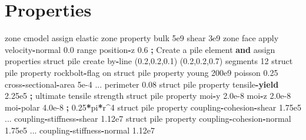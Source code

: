 \documentclass[a4paper, nobind]{templates/ociamthesis}
\newenvironment{Shaded}{\begin{snugshade}}{\end{snugshade}}
\newcommand{\BuiltInTok}[1]{#1}
\newcommand{\ControlFlowTok}[1]{\textcolor[rgb]{0.13,0.29,0.53}{\textbf{#1}}}
\newcommand{\DecValTok}[1]{\textcolor[rgb]{0.00,0.00,0.81}{#1}}
\newcommand{\FloatTok}[1]{\textcolor[rgb]{0.00,0.00,0.81}{#1}}
\newcommand{\KeywordTok}[1]{\textcolor[rgb]{0.13,0.29,0.53}{\textbf{#1}}}
\newcommand{\NormalTok}[1]{#1}
\newcommand{\OperatorTok}[1]{\textcolor[rgb]{0.81,0.36,0.00}{\textbf{#1}}}
\renewenvironment{Shaded}
{
  \vspace{10pt}%
  \begin{snugshade}%
}{%
  \end{snugshade}%
  \vspace{8pt}%
}
\begin{document}
\hypertarget{properties-1}{%
\section{Properties}\label{properties-1}}

\begin{Shaded}
\begin{Highlighting}[]
\NormalTok{zone cmodel assign elastic}
\NormalTok{zone }\BuiltInTok{property}\NormalTok{ bulk }\FloatTok{5e9}\NormalTok{ shear }\FloatTok{3e9}
\NormalTok{zone face }\BuiltInTok{apply}\NormalTok{ velocity}\OperatorTok{{-}}\NormalTok{normal }\FloatTok{0.0} \BuiltInTok{range}\NormalTok{ position}\OperatorTok{{-}}\NormalTok{z }\FloatTok{0.6}
\OperatorTok{;}\NormalTok{ Create a pile element }\KeywordTok{and}\NormalTok{ assign properties}
\NormalTok{struct pile create by}\OperatorTok{{-}}\NormalTok{line (}\FloatTok{0.2}\NormalTok{,}\FloatTok{0.2}\NormalTok{,}\FloatTok{0.1}\NormalTok{) (}\FloatTok{0.2}\NormalTok{,}\FloatTok{0.2}\NormalTok{,}\FloatTok{0.7}\NormalTok{) segments }\DecValTok{12}
\NormalTok{struct pile }\BuiltInTok{property}\NormalTok{ rockbolt}\OperatorTok{{-}}\NormalTok{flag on}
\NormalTok{struct pile }\BuiltInTok{property}\NormalTok{ young }\FloatTok{200e9}\NormalTok{ poisson }\FloatTok{0.25}\NormalTok{ cross}\OperatorTok{{-}}\NormalTok{sectional}\OperatorTok{{-}}\NormalTok{area }\FloatTok{5e{-}4}\NormalTok{ ...}
\NormalTok{                     perimeter }\FloatTok{0.08}
\NormalTok{struct pile }\BuiltInTok{property}\NormalTok{ tensile}\OperatorTok{{-}}\ControlFlowTok{yield}   \FloatTok{2.25e5}  \OperatorTok{;}\NormalTok{ ultimate tensile strength}
\NormalTok{struct pile }\BuiltInTok{property}\NormalTok{ moi}\OperatorTok{{-}}\NormalTok{y }\FloatTok{2.0e{-}8}\NormalTok{ moi}\OperatorTok{{-}}\NormalTok{z }\FloatTok{2.0e{-}8}\NormalTok{ moi}\OperatorTok{{-}}\NormalTok{polar }\FloatTok{4.0e{-}8} \OperatorTok{;} \FloatTok{0.25}\OperatorTok{*}\NormalTok{pi}\OperatorTok{*}\NormalTok{r}\OperatorTok{\^{}}\DecValTok{4}
\NormalTok{struct pile }\BuiltInTok{property}\NormalTok{ coupling}\OperatorTok{{-}}\NormalTok{cohesion}\OperatorTok{{-}}\NormalTok{shear }\FloatTok{1.75e5}\NormalTok{ ...}
\NormalTok{                     coupling}\OperatorTok{{-}}\NormalTok{stiffness}\OperatorTok{{-}}\NormalTok{shear }\FloatTok{1.12e7}
\NormalTok{struct pile }\BuiltInTok{property}\NormalTok{ coupling}\OperatorTok{{-}}\NormalTok{cohesion}\OperatorTok{{-}}\NormalTok{normal }\FloatTok{1.75e5}\NormalTok{ ...}
\NormalTok{                     coupling}\OperatorTok{{-}}\NormalTok{stiffness}\OperatorTok{{-}}\NormalTok{normal }\FloatTok{1.12e7}

\end{Highlighting}
\end{Shaded}
\end{document}
